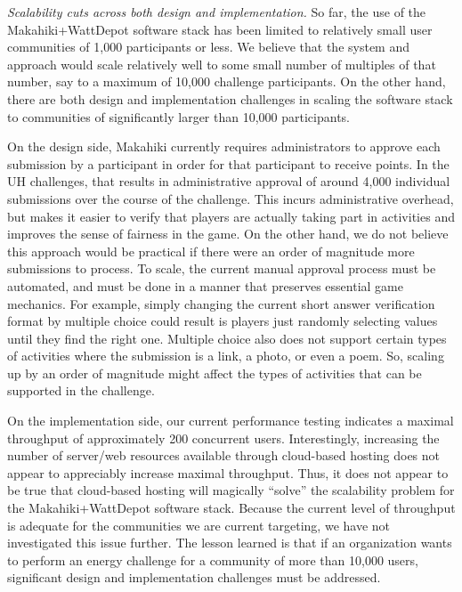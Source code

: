 {\em Scalability cuts across both design and implementation.}  So far, the use of the Makahiki+WattDepot software stack has been limited to relatively small user communities of 1,000 participants or less.  We believe that the system and approach would scale relatively well to some small number of multiples of that number, say to a maximum of 10,000 challenge participants.  On the other hand, there are both design and implementation challenges in scaling the software stack to communities of significantly larger than 10,000 participants.

On the design side, Makahiki currently requires administrators to approve each submission by a participant in order for that participant to receive points.   In the UH challenges, that results in administrative approval of around 4,000 individual submissions over the course of the challenge.  This incurs administrative overhead, but makes it easier to verify that players are actually taking part in activities and improves the sense of fairness in the game.  On the other hand, we do not believe this approach would be practical if there were an order of magnitude more submissions to process.  To scale, the current manual approval process must be automated, and must be done in a manner that preserves essential game mechanics.  For example, simply changing the current short answer verification format by multiple choice could result is players just randomly selecting values until they find the right one.  Multiple choice also does not support certain types of activities where the submission is a link, a photo, or even a poem.  So, scaling up by an order of magnitude might affect the types of activities that can be supported in the challenge.  

On the implementation side, our current performance testing indicates a maximal throughput of approximately 200 concurrent users.  Interestingly, increasing the number of server/web resources available through cloud-based hosting does not appear to appreciably increase maximal throughput.  Thus, it does not appear to be true that cloud-based hosting will magically ``solve'' the scalability problem for the Makahiki+WattDepot software stack.  Because the current level of throughput is adequate for the communities we are current targeting, we have not investigated this issue further.  The lesson learned is that if an organization wants to perform an energy challenge for a community of more than 10,000 users, significant design and implementation challenges must be addressed.






